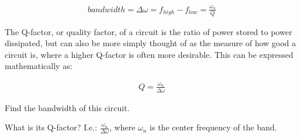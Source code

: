 \begin{align}
    bandwidth = \Delta \omega = f_{high} - f_{low} = \frac{\omega_n}{Q}
\end{align}

The Q-factor, or quality factor, of a circuit is the ratio of power stored to power dissipated, but can also be more simply thought of as the measure of how good a circuit is,
where a higher Q-factor is often more desirable. This can be expressed mathematically as:

\begin{align}
    Q = \frac{\omega_{n}}{\Delta \omega}
\end{align}


\begin{enumerate}[resume]
  \qitem Find the bandwidth of this circuit.

  \qitem What is its Q-factor? I.e.: $\frac{\omega_{n}}{\Delta \omega}$, where $\omega_{n}$ is the center frequency of the band.
  
\end{enumerate}
